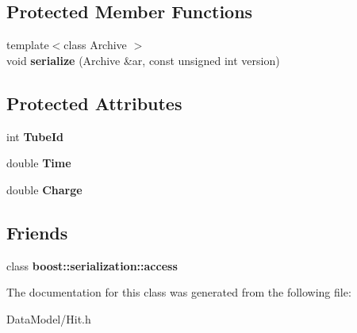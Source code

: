 \subsection*{Protected Member Functions}
\begin{DoxyCompactItemize}
\item 
\hypertarget{classHit_a96a66d9f2f51e104390db5e7ba554bb0}{
{\footnotesize template$<$class Archive $>$ }\\void {\bfseries serialize} (Archive \&ar, const unsigned int version)}
\label{classHit_a96a66d9f2f51e104390db5e7ba554bb0}

\end{DoxyCompactItemize}
\subsection*{Protected Attributes}
\begin{DoxyCompactItemize}
\item 
\hypertarget{classHit_a442f7a2eebdfbc0e8c29194f4e26e40e}{
int {\bfseries TubeId}}
\label{classHit_a442f7a2eebdfbc0e8c29194f4e26e40e}

\item 
\hypertarget{classHit_a8abba0e32e50c99ed70f38f660486e29}{
double {\bfseries Time}}
\label{classHit_a8abba0e32e50c99ed70f38f660486e29}

\item 
\hypertarget{classHit_a6460be8aae8df3d04ae3871d99bf0193}{
double {\bfseries Charge}}
\label{classHit_a6460be8aae8df3d04ae3871d99bf0193}

\end{DoxyCompactItemize}
\subsection*{Friends}
\begin{DoxyCompactItemize}
\item 
\hypertarget{classHit_ac98d07dd8f7b70e16ccb9a01abf56b9c}{
class {\bfseries boost::serialization::access}}
\label{classHit_ac98d07dd8f7b70e16ccb9a01abf56b9c}

\end{DoxyCompactItemize}


The documentation for this class was generated from the following file:\begin{DoxyCompactItemize}
\item 
DataModel/Hit.h\end{DoxyCompactItemize}
